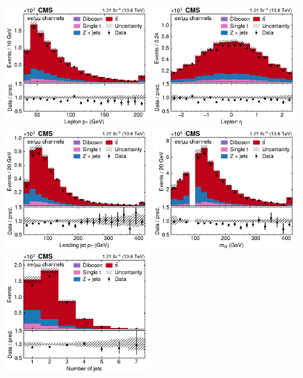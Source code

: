 \begin{figure}[!p]
\centering
\includegraphics[width=0.49\textwidth]{figures/ttxs/lep_pt_eemm.pdf}
\hfill
\includegraphics[width=0.49\textwidth]{figures/ttxs/lep_eta_eemm.pdf}
\includegraphics[width=0.49\textwidth]{figures/ttxs/1st_jet_pt_eemm.pdf}
\hfill
\includegraphics[width=0.49\textwidth]{figures/ttxs/mll_eemm.pdf}
\includegraphics[width=0.49\textwidth]{figures/ttxs/njet_eemm.pdf}

\end{figure}
